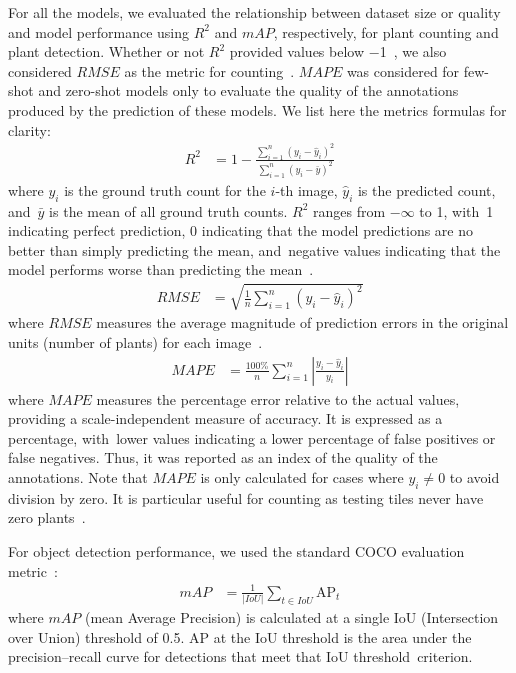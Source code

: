 \documentclass[12pt,a4paper,oneside]{report}
\begin{document}
For all the models, we evaluated the relationship between dataset size or quality and model performance
using $R^2$ and $mAP$, respectively, for plant counting and plant detection. Whether or not
$R^2$ provided values below $-$1~\cite{chicco_coefficient_2021}, we also considered 
$RMSE$ as the metric for counting~\cite{draper1998applied}.
$MAPE$ was considered for few-shot and zero-shot models only to evaluate the 
quality of the annotations produced by the prediction of these models.
We list here the metrics formulas for clarity:
\begin{align}
R^2 &= 1 - \frac{\sum_{i=1}^{n} (y_i - \hat{y}_i)^2}{\sum_{i=1}^{n} (y_i - \bar{y})^2}
\end{align}
where $y_i$ is the ground truth count for the $i$-th image, $\hat{y}_i$ is the 
predicted count, and~$\bar{y}$ is the mean of all ground truth counts. $R^2$ ranges 
from $-\infty$ to 1, with~1 indicating perfect prediction, 0 indicating that the 
model predictions are no better than simply predicting the mean, and~negative 
values indicating that the model performs worse than predicting the mean~\cite{chicco_coefficient_2021,draper1998applied}.
\begin{align}
\text{$RMSE$} &= \sqrt{\frac{1}{n}\sum_{i=1}^{n} (y_i - \hat{y}_i)^2}
\end{align}
where $RMSE$ measures the average magnitude of prediction errors in the original 
units (number of plants) for each image~\cite{draper1998applied}.
\begin{align}
\text{$MAPE$} &= \frac{100\%}{n}\sum_{i=1}^{n} \left| \frac{y_i - \hat{y}_i}{y_i} \right|
\end{align}
where $MAPE$ measures the percentage error relative to the actual values, providing a scale-independent 
measure of accuracy. It is expressed as a percentage, with~lower values indicating a lower
percentage of false positives or false negatives.
Thus, it was reported as an index of the quality of the annotations.
Note that $MAPE$ is only calculated for cases where $y_i \neq 0$ to avoid division by zero.
It is particular useful for counting as testing tiles never have zero plants~\cite{ARMSTRONG199269}.

For object detection performance, we used the standard COCO evaluation \mbox{metric~\cite{linMicrosoftCOCOCommon2015,everingham_pascal_2010}}:
\begin{align}
\text{$mAP$} &= \frac{1}{|IoU|}\sum_{t \in IoU}\text{AP}_t
\end{align}
where $mAP$ (mean Average Precision) is calculated at a single IoU %
 (Intersection over Union) 
threshold of 0.5.
AP at the IoU threshold is the area under the precision--recall curve for detections 
that meet that IoU threshold~criterion.
\end{document}
